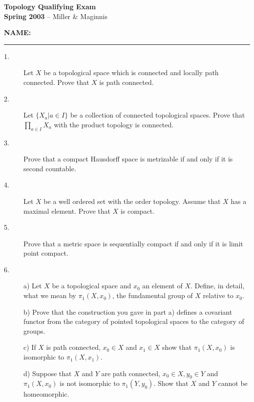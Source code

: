 \documentclass[12pt]{article}
\begin{document}
\begin{large}

\begin{center}
{\bf  Topology Qualifying Exam}\\
{\bf Spring 2003} -- Miller \& Maginnis \\
\end{center}

\hfill {\bf NAME:}\rule{2.5in}{.01in}



\vspace{-.2in}
\begin{description}

\item[1.] Let $X$ be a topological space which is connected and locally path
connected. Prove that $X$ is path connected.


\vspace{.2in}\item[2.] Let $\{X_a|a\in I\}$ be a collection of connected
topological spaces. Prove that $\prod_{a\in I}X_a$ with the product topology 
is connected.


\vspace{.2in}\item[3.] Prove that a compact Hausdorff space is metrizable if
and only if it is second countable.


\vspace{.2in}\item[4.] Let $X$ be a well ordered set with the order topology.
Assume that $X$ has a maximal element. Prove that $X$ is compact.


\vspace{.2in}\item[5.] Prove that a metric space is sequentially compact if
and only if it is limit point compact.


\vspace{.2in}\item[6.] a) Let $X$ be a topological space and $x_0$ an element
of $X$. Define, in detail, what we mean by $\pi_1(X,x_0)$, the fundamental
group of $X$ relative to $x_0$.


\vspace{.2in}\item[\quad]  b) Prove that the construction you gave in part a)
defines a covariant functor from the category of pointed topological spaces
to the category of groups.


\vspace{.2in}\item[\quad]  c) If $X$ is path connected, $x_0\in X$ and
$x_1\in X$ show that $\pi_1(X,x_0)$ is isomorphic to $\pi_1(X,x_1)$.


\vspace{.2in}\item[\quad]  d) Suppose that $X$ and $Y$ are path connected,
$x_0\in X, y_0\in Y$ and $\pi_1(X,x_0)$ is not isomorphic to $\pi_1(Y,y_0)$.
Show that $X$ and $Y$ cannot be homeomorphic.




\end{description}
\end{large}
\end{document}
